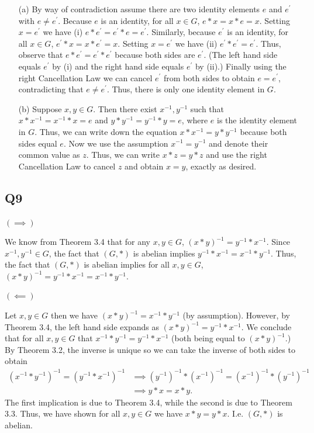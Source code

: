 \documentclass[12pt]{article}
\numberwithin{theorem}{section}
\numberwithin{equation}{section}
\numberwithin{remark}{section}
\numberwithin{definition}{section}
\numberwithin{theorem}{section}
\numberwithin{lemma}{section}
\numberwithin{example}{section}
\begin{document}
\begin{itemize}
	\item[(a)]{By way of contradiction assume there are two identity elements $e$ and $e^\prime$ with $e\neq e^\prime$. Because $e$ is an identity, for all $x\in G$, $e*x=x*e=x$. Setting $x=e^\prime$ we have (i) $e*e^\prime=e^\prime*e=e^\prime$. Similarly, because $e^\prime$ is an identity, for all $x\in G$, $e^\prime*x=x*e^\prime=x$. Setting $x=e^\prime$ we have (ii) $e^\prime*e^\prime=e^\prime$. Thus, observe that $e*e^\prime=e^\prime*e^\prime$ because both sides are $e^\prime$. (The left hand side equals $e^\prime$ by (i) and the right hand side equals $e^\prime$ by (ii).) Finally using the right Cancellation Law we can cancel $e^\prime$ from both sides to obtain $e=e^\prime$, contradicting that $e\neq e^\prime$. Thus, there is only one identity element in $G$.}
	\item[(b)]{Suppose $x,y\in G$. Then there exist $x^{-1},y^{-1}$ such that $x*x^{-1}=x^{-1}*x=e$ and $y*y^{-1}=y^{-1}*y=e$, where $e$ is the identity element in $G$. Thus, we can write down the equation $x*x^{-1}=y*y^{-1}$ because both sides equal $e$. Now we use the assumption $x^{-1}=y^{-1}$ and denote their common value as $z$. Thus, we can write $x*z=y*z$ and use the right Cancellation Law to cancel $z$ and obtain $x=y$, exactly as desired.}
\end{itemize}



\subsection{Q9}

$\left(\implies\right)$ 

We know from Theorem 3.4 that for any $x,y\in G$, $\left(x*y\right)^{-1}=y^{-1}*x^{-1}$. Since $x^{-1},y^{-1}\in G$, the fact that $(G,*)$ is abelian implies $y^{-1}*x^{-1}=x^{-1}*y^{-1}$. Thus, the fact that $(G,*)$ is abelian implies for all $x,y\in G$, $\left(x*y\right)^{-1}=y^{-1}*x^{-1}=x^{-1}*y^{-1}.$

\noindent $\left(\impliedby\right)$ 

Let $x,y\in G$ then we have $\left(x*y\right)^{-1}=x^{-1}*y^{-1}$ (by assumption). However, by Theorem 3.4, the left hand side expands as $\left(x*y\right)^{-1}=y^{-1}*x^{-1}$. We conclude that for all $x,y\in G$ that $x^{-1}*y^{-1}=y^{-1}*x^{-1}$ (both being equal to $\left(x*y\right)^{-1}$.) By Theorem 3.2, the inverse is unique so we can take the inverse of both sides to obtain 
\begin{align*}
	\left(x^{-1}*y^{-1}\right)^{-1}=\left(y^{-1}*x^{-1}\right)^{-1} & \implies \left(y^{-1}\right)^{-1}* \left(x^{-1}\right)^{-1}=\left(x^{-1}\right)^{-1}* \left(y^{-1}\right)^{-1}\\
	&\implies y*x = x*y.
\end{align*}
The first implication is due to Theorem 3.4, while the second is due to Theorem 3.3. Thus, we have shown for all $x,y\in G$ we have $x*y=y*x$. I.e. $(G,*)$ is abelian. 
\end{document}
